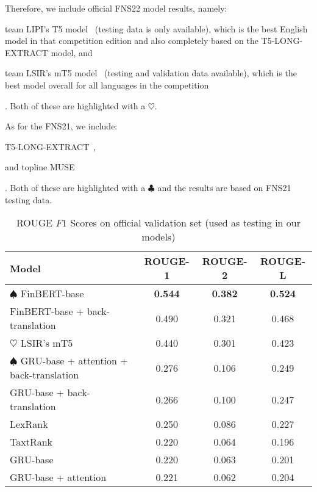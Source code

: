Therefore, we include official FNS22 model results, namely:
\begin{enumerate*}
    \item team LIPI's T5 model~\cite{el-haj-etal-2022-financial} (testing data is only available), which is the best English model
          in that competition edition and also completely based on the T5-LONG-EXTRACT model, and
    \item team LSIR's mT5 model~\cite{foroutan-etal-2022-multilingual} (testing and validation data available), which is the best model overall for all languages in the competition
\end{enumerate*}.
Both of these are highlighted with a $\heartsuit$.

As for the FNS21, we include:
\begin{enumerate*}
    \item T5-LONG-EXTRACT~\cite{orzhenovskii-2021-t5},
    \item and topline MUSE~\cite{litvak-last-2013-multilingual}
\end{enumerate*}.
Both of these are highlighted with a $\clubsuit$ and the results are based on FNS21 testing data.


\begin{table}[ht]
    \centering
    \begin{tabular}{lccc}
        \toprule
        \textbf{Model} & \textbf{ROUGE-1} & \textbf{ROUGE-2} & \textbf{ROUGE-L} \\
        \midrule
            $\spadesuit$ FinBERT-base & \textbf{0.544} & \textbf{0.382} & \textbf{0.524} \\
            FinBERT-base + back-translation & 0.490 & 0.321 & 0.468 \\
            $\heartsuit$ LSIR's mT5 & 0.440 & 0.301 & 0.423 \\
            $\spadesuit$ GRU-base + attention + back-translation & 0.276 & 0.106 & 0.249 \\
            GRU-base + back-translation & 0.266 & 0.100 & 0.247 \\
            LexRank & 0.250 & 0.086 & 0.227 \\
            TaxtRank & 0.220 & 0.064 & 0.196 \\
            GRU-base & 0.220 & 0.063 & 0.201 \\
            GRU-base + attention & 0.221 & 0.062 & 0.204 \\
        \bottomrule
    \end{tabular}\caption{ROUGE $F1$ Scores on official validation set (used as testing in our models)}
    \label{tab:rouge_performance_validation}
\end{table}

